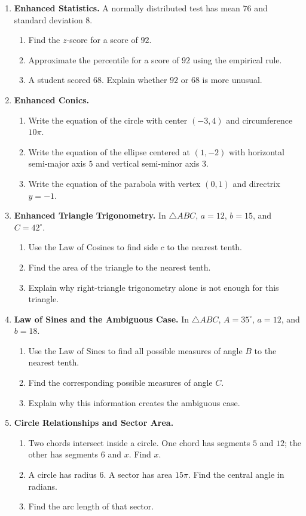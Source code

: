 \documentclass[11pt]{article}
\newcommand{\longwork}{\vspace{4.2cm}}
\begin{document}
\begin{enumerate}
\item \textbf{Enhanced Statistics.} A normally distributed test has mean $76$ and standard deviation $8$.
\begin{enumerate}[label=(\alph*)]
\item Find the $z$-score for a score of $92$.
\item Approximate the percentile for a score of $92$ using the empirical rule.
\item A student scored $68$. Explain whether $92$ or $68$ is more unusual.
\end{enumerate}
\longwork

\newpage
\item \textbf{Enhanced Conics.}
\begin{enumerate}[label=(\alph*)]
\item Write the equation of the circle with center $(-3,4)$ and circumference $10\pi$.
\item Write the equation of the ellipse centered at $(1,-2)$ with horizontal semi-major axis $5$ and vertical semi-minor axis $3$.
\item Write the equation of the parabola with vertex $(0,1)$ and directrix $y=-1$.
\end{enumerate}
\longwork

\item \textbf{Enhanced Triangle Trigonometry.} In $\triangle ABC$, $a=12$, $b=15$, and $C=42^\circ$.
\begin{enumerate}[label=(\alph*)]
\item Use the Law of Cosines to find side $c$ to the nearest tenth.
\item Find the area of the triangle to the nearest tenth.
\item Explain why right-triangle trigonometry alone is not enough for this triangle.
\end{enumerate}
\longwork

\newpage
\item \textbf{Law of Sines and the Ambiguous Case.} In $\triangle ABC$, $A=35^\circ$, $a=12$, and $b=18$.
\begin{enumerate}[label=(\alph*)]
\item Use the Law of Sines to find all possible measures of angle $B$ to the nearest tenth.
\item Find the corresponding possible measures of angle $C$.
\item Explain why this information creates the ambiguous case.
\end{enumerate}
\longwork

\item \textbf{Circle Relationships and Sector Area.}
\begin{enumerate}[label=(\alph*)]
\item Two chords intersect inside a circle. One chord has segments $5$ and $12$; the other has segments $6$ and $x$. Find $x$.
\item A circle has radius $6$. A sector has area $15\pi$. Find the central angle in radians.
\item Find the arc length of that sector.
\end{enumerate}
\longwork
\end{enumerate}
\end{document}
